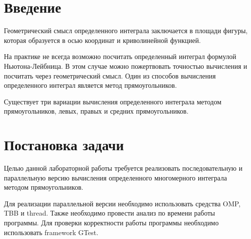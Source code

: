 \documentclass{report}
\begin{document}
 \setcounter{page}{2}

 \tableofcontents
 \newpage

 \section*{Введение}
 Геометрический смысл определенного интеграла заключается в площади фигуры, которая образуется в осью координат и криволинейной функцией.
 \par На практике не всегда возможно посчитать определенный интеграл формулой Ньютона-Лейбница. В этом случае можно пожертвовать точностью вычисления и посчитать через геометрический смысл. Один из способов вычисления определенного интеграл является метод прямоугольников.
 \par Существует три вариации вычисления определенного интеграла методом прямоугольников, левых, правых и средних прямоугольников.
 \newpage

 \section*{Постановка задачи}
 Целью  данной лабораторной работы требуется реализовать последовательную и параллельную версию вычисления определенного многомерного интеграла методом прямоугольников.
 \par Для реализации параллельной версии необходимо использовать средства OMP, TBB и thread.  Также необходимо провести анализ по времени работы программы. Для проверки корректности работы программы необходимо использовать framework GTest.
 \newpage

\end{document}
